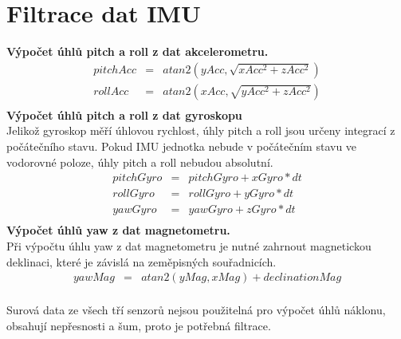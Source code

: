 \section{Filtrace dat IMU}
\textbf{Výpočet úhlů pitch a roll z dat akcelerometru.}\\
\begin{eqnarray*} 
	pitchAcc & = & atan2 (yAcc , \sqrt{xAcc^{2} + zAcc^{2}})\\
	rollAcc & = & atan2 (xAcc , \sqrt{yAcc^{2} + zAcc^{2}})\\
\end{eqnarray*} 
\textbf{Výpočet úhlů pitch a roll z dat gyroskopu}\\
Jelikož gyroskop měří úhlovou rychlost, úhly pitch a roll jsou určeny integrací z počátečního stavu. Pokud IMU jednotka nebude v počátečním stavu ve vodorovné poloze, úhly pitch a roll nebudou absolutní.\\
\begin{eqnarray*} 
	pitchGyro & = & pitchGyro + xGyro * dt\\
	rollGyro & = & rollGyro + yGyro * dt\\
	yawGyro & = & yawGyro + zGyro * dt\\
\end{eqnarray*} 
\textbf{Výpočet úhlů yaw z dat magnetometru.}\\
Při výpočtu úhlu yaw z dat magnetometru je nutné zahrnout magnetickou deklinaci, které je závislá na zeměpisných souřadnicích. \cite{declination}\\
\begin{eqnarray*} 
	yawMag & = & atan2(yMag, xMag)+ declinationMag\\
\end{eqnarray*} 

Surová data ze všech tří senzorů nejsou použitelná pro výpočet úhlů náklonu, obsahují nepřesnosti a šum, proto je potřebná filtrace.\\


